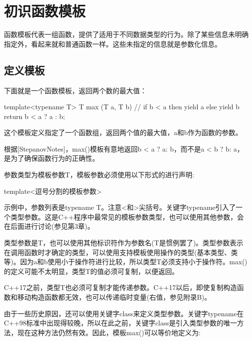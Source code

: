 \section{初识函数模板}

函数模板代表一组函数，提供了适用于不同数据类型的行为。除了某些信息未明确指定外，看起来就和普通函数一样。这些未指定的信息就是参数化信息。

\subsection{定义模板}

下面就是一个函数模板，返回两个数的最大值：

\begin{cpp}
template<typename T>
T max (T a, T b)
{
	// if b < a then yield a else yield b
	return b < a ? a : b;
}
\end{cpp}

这个模板定义指定了一个函数组，返回两个值的最大值，a和b作为函数的参数。

\begin{notice}
根据[StepanovNotes]，max()模板有意地返回b < a ? a: b，而不是a < b ? b: a，是为了确保函数行为的正确性。
\end{notice}

参数类型为模板参数T，模板参数必须使用以下形式的进行声明:

\begin{cpp}
template<逗号分割的模板参数>
\end{cpp}

示例中，参数列表是typename T。注意<和>尖括号。关键字typename引入了一个类型参数。这是C++程序中最常见的模板参数类型，也可以使用其他参数，会在后面进行讨论(参见第3章)。

类型参数是T，也可以使用其他标识符作为参数名(T是惯例罢了)。类型参数表示在调用函数时才确定的类型，可以使用支持模板使用操作的类型(基本类型、类等)。因为a和b使用小于操作符进行比较，所以类型T必须支持小于操作符。max()的定义可能不太明显，类型T的值必须可复制，以便返回。

\begin{notice}
C++17之前，类型T也必须可复制才能传递参数。C++17以后，即使复制构造函数和移动构造函数都无效，也可以传递临时变量(右值，参见附录B)。
\end{notice}

由于一些历史原因，还可以使用关键字class来定义类型参数。关键字typename在C++98标准中出现得较晚，所以在此之前，关键字class是引入类型参数的唯一方法，现在这种方法仍然有效。因此，模板max()可以等价地定义为:

